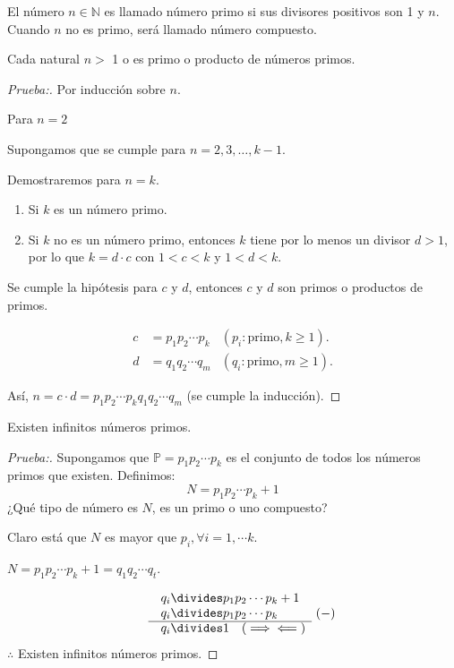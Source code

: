 \documentclass[oneside,a5paper]{memoir}
\begin{document}
\begin{definition}

El número $n\in\mathbb{N}$ es llamado número primo si sus divisores positivos son 1 y $n$. Cuando $n$ no es primo, será llamado número compuesto. 

\end{definition}

\begin{theorem}
Cada natural $n>$ 1 o es primo o producto de números primos.

\begin{proof}[Prueba:]
Por inducción sobre $n$.

Para $n=2$ \checkmark

Supongamos que se cumple para $n=2,3,\ldots,k-1$.

Demostraremos para $n=k$.

\begin{enumerate}[font={\bfseries},label={*)}]

\item Si $k$ es un número primo.

\item Si $k$ no es un número primo, entonces $k$ tiene por lo menos un divisor $d>1$, por lo que $k=d\cdot c$ con $1<c<k$ y $1<d<k$.

\end{enumerate}

\noindent
Se cumple la hipótesis para $c$ y $d$, entonces $c$ y $d$ son primos o productos de primos.

\begin{align*}
c&=p_1p_2\cdots p_k&(p_i\colon\text{primo}, k\geq1).\\
d&=q_1q_2\cdots q_m&(q_i\colon\text{primo}, m\geq1).
\end{align*}

\noindent
Así, $n=c\cdot d=p_1p_2\cdots p_kq_1q_2\cdots q_m$ (se cumple la inducción).
\end{proof}
\end{theorem}

\begin{theorem}
Existen infinitos números primos.

\begin{proof}[Prueba:]

Supongamos que $\boxed{\mathbb{P}=p_1p_2\cdots p_k}$ es el conjunto  de todos los números primos que existen. Definimos:
\[N=p_1p_2\cdots p_k+1\]
¿Qué tipo de número es $N$, es un primo o uno compuesto?

\noindent
Claro está que $N$ es mayor que $p_i,\forall i=1,\cdots k$.

$N=p_1p_2\cdots p_k+1=q_1q_2\cdots q_t$.

\[\begin{array}{l@{\quad}cr@{}l}
&& q_i & {}\divides p_1p_2\cdots p_k+1 \\
&& q_i & {}\divides p_1p_2\cdots p_k \\ \cline{2-4}
&& q_i & {}\divides 1\quad(\implies\impliedby)
\end{array}\ (-)\]
$\therefore$ Existen infinitos números primos. %
\end{proof}

\end{theorem}
\end{document}
